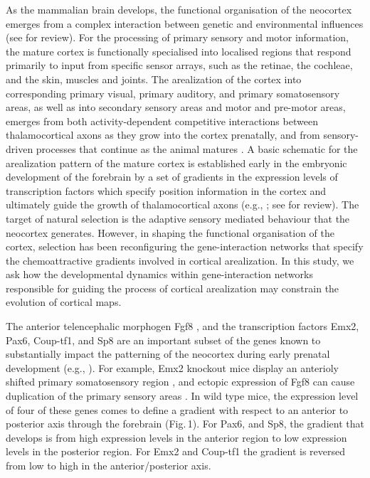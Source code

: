 \documentclass[10pt,letterpaper]{article}
\begin{document}
As the mammalian brain develops, the functional organisation of the neocortex emerges from a complex interaction between genetic and environmental influences (see \cite{Krubitzer2018} for review). For the processing of primary sensory and motor information, the mature cortex is functionally specialised into localised regions that respond primarily to input from specific sensor arrays, such as the retinae, the cochleae, and the skin, muscles and joints. The arealization of the cortex into corresponding primary visual, primary auditory, and primary somatosensory areas, as well as into secondary sensory areas and motor and pre-motor areas, emerges from both activity-dependent competitive interactions between thalamocortical axons as they grow into the cortex prenatally, and from sensory-driven processes that continue as the animal matures \cite{REFS}. A basic schematic for the arealization pattern of the mature cortex is established early in the embryonic development of the forebrain by a set of gradients in the expression levels of transcription factors which specify position information in the cortex and ultimately guide the growth of thalamocortical axons (e.g., \cite{Sur2005,Ypsilanti2016}; see \cite{Greig2013,Anton2018} for review). The target of natural selection is the adaptive sensory mediated behaviour that the neocortex generates. However, in shaping the functional organisation of the cortex, selection has been reconfiguring the gene-interaction networks that specify the chemoattractive gradients involved in cortical arealization. In this study, we ask how the developmental dynamics within gene-interaction networks responsible for guiding the process of cortical arealization may constrain the evolution of cortical maps. %

The anterior telencephalic morphogen Fgf8 \cite{Shimogori2005}, and the transcription factors Emx2, Pax6, Coup-tf1, and Sp8 are an important subset of the genes known to substantially impact the patterning of the neocortex during early prenatal development (e.g., \cite{Hamasaki2004,Manuel2007,Borello2014,Armentano2007,Greig2013}). For example, Emx2 knockout mice display an anterioly shifted primary somatosensory region \cite{Bishop2000,Bishop2002}, and ectopic expression of Fgf8 can cause duplication of the primary sensory areas \cite{Assimacopoulos2012}. In wild type mice, the expression level of four of these genes comes to define a gradient with respect to an anterior to posterior axis through the forebrain (Fig.\,1). For Pax6, and Sp8, the gradient that develops is from high expression levels in the anterior region to low expression levels in the posterior region. For Emx2 and Coup-tf1 the gradient is reversed from low to high in the anterior/posterior axis.
\end{document}
